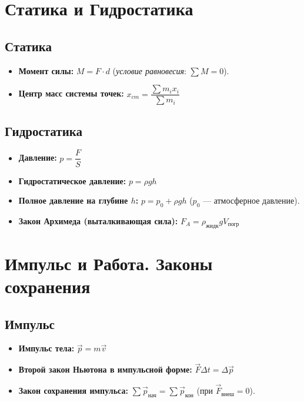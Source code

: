 \documentclass[11pt, a4paper]{article}
\begin{document}
\section{Статика и Гидростатика}

\subsection{Статика}
\begin{itemize}
    \item \textbf{Момент силы:} $M = F \cdot d$ \quad (\textit{условие равновесия}: $\sum M = 0$).
    \item \textbf{Центр масс системы точек:} $x_{cm} = \dfrac{\sum m_i x_i}{\sum m_i}$
\end{itemize}

\subsection{Гидростатика}
\begin{itemize}
    \item \textbf{Давление:} $p = \dfrac{F}{S}$
    \item \textbf{Гидростатическое давление:} $p = \rho g h$
    \item \textbf{Полное давление на глубине $h$:} $p = p_0 + \rho g h$ \quad ($p_0$ --- атмосферное давление).
    \item \textbf{Закон Архимеда (выталкивающая сила):} $F_A = \rho_{\text{жидк}} g V_{\text{погр}}$
\end{itemize}

\section{Импульс и Работа. Законы сохранения}

\subsection{Импульс}
\begin{itemize}
    \item \textbf{Импульс тела:} $\vec{p} = m \vec{v}$
    \item \textbf{Второй закон Ньютона в импульсной форме:} $\vec{F} \Delta t = \Delta \vec{p}$
    \item \textbf{Закон сохранения импульса:} $\sum \vec{p}_{\text{нач}} = \sum \vec{p}_{\text{кон}}$ (при $\vec{F}_{\text{внеш}} = 0$).
\end{itemize}
\end{document}
